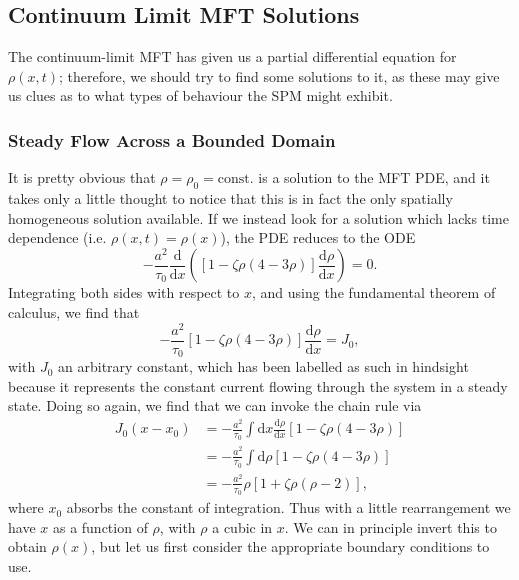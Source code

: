 \subsection{Continuum Limit MFT Solutions}
The continuum-limit MFT has given us a partial differential equation for $\rho(x, t)$; therefore, we should try to find some solutions to it, as these may give us clues as to what types of behaviour the SPM might exhibit.

\subsubsection{Steady Flow Across a Bounded Domain}
\label{sec:steadyFlowSoln}
It is pretty obvious that $\rho=\rho_0=\mathrm{const.}$ is a solution to the MFT PDE, and it takes only a little thought to notice that this is in fact the only spatially homogeneous solution available. If we instead look for a
solution which lacks time dependence (i.e. $\rho(x, t) = \rho(x)$), the PDE reduces to the ODE
\begin{equation}
 -\frac{a^2}{\tau_0} \frac{\mathrm{d}}{\mathrm{d}x} \left( \left[1 - \zeta \rho\left(4-3\rho\right) \right] \frac{\mathrm{d}\rho}{\mathrm{d}x} \right) = 0.
\end{equation}
Integrating both sides with respect to $x$, and using the fundamental theorem of calculus, we find that 
\begin{equation}
   -\frac{a^2}{\tau_0} \left[1 - \zeta \rho\left(4-3\rho\right) \right] \frac{\mathrm{d}\rho}{\mathrm{d}x}  = J_0 ,
\end{equation}
with $J_0$ an arbitrary constant, which has been labelled as such in hindsight because it represents the constant current flowing through the system in a steady state.
Doing so again, we find that we can invoke the chain rule via
\begin{align}
\label{eq:steadyDeriv}
   J_0 (x - x_0) &= -\frac{a^2}{\tau_0} \int  \! \! \mathrm{d}x  \frac{\mathrm{d}\rho}{\mathrm{d}x} \left[1 - \zeta \rho\left(4-3\rho\right) \right] \\
       &=   -\frac{a^2}{\tau_0} \int  \! \! \mathrm{d}\rho   \left[1 - \zeta \rho\left(4-3\rho\right) \right] \\
       &= -\frac{a^2}{\tau_0} \rho \left[1+\zeta \rho\left(\rho-2\right)\right],
\end{align}
where $x_0$ absorbs the constant of integration.
Thus with a little rearrangement we have $x$ as a function of $\rho$, with $\rho$ a cubic in $x$. We can in principle invert this to obtain $\rho (x)$, but let us first consider the appropriate boundary conditions to use.

